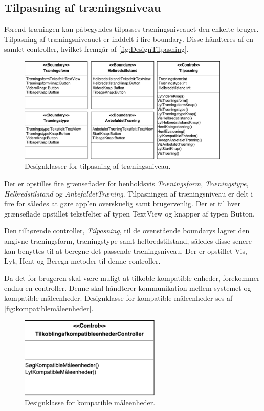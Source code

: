 \subsection*{Tilpasning af træningsniveau}
Førend træningen kan påbegyndes tilpasses træningsniveauet den enkelte bruger. Tilpasning af træningsniveauet er inddelt i fire boundary. Disse håndteres af en samlet controller, hvilket fremgår af \autoref{fig:DesignTilpasning}.

\begin{figure} [H]
\centering
\includegraphics[width=0.9\textwidth]{figures/MVC/MVCTilpasning}
\caption{Designklasser for tilpasning af træningsniveau.}
\label{fig:DesignTilpasning}
\end{figure}

\noindent
Der er opstilles fire grænseflader for henholdsvis \textit{Træningsform}, \textit{Træningstype}, \textit{Helbredstilstand} og \textit{AnbefaldetTræning}. Tilpasningen af træningsniveau er delt i fire for således at gøre app’en overskuelig samt brugervenlig. Der er til hver grænseflade opstillet tekstfelter af typen TextView og knapper af typen Button.   

Den tilhørende controller, \textit{Tilpasning}, til de ovenstående boundarys lagrer den angivne træningsform, træningstype samt helbredstilstand, således disse senere kan benyttes til at beregne det passende træningsniveau. Der er opstillet Vis, Lyt, Hent og Beregn metoder til denne controller. 

Da det for brugeren skal være muligt at tilkoble kompatible enheder, forekommer endnu en controller. Denne skal håndterer kommunikation mellem systemet og kompatible måleenheder. Designklasse for kompatible måleenheder ses af \autoref{fig:kompatiblemåleenheder}.

\begin{figure} [H]
\centering
\includegraphics[width=0.6\textwidth]{figures/MVC/MVCKompMaale}
\caption{Designklasse for kompatible måleenheder.}
\label{fig:kompatiblemåleenheder}
\end{figure}

